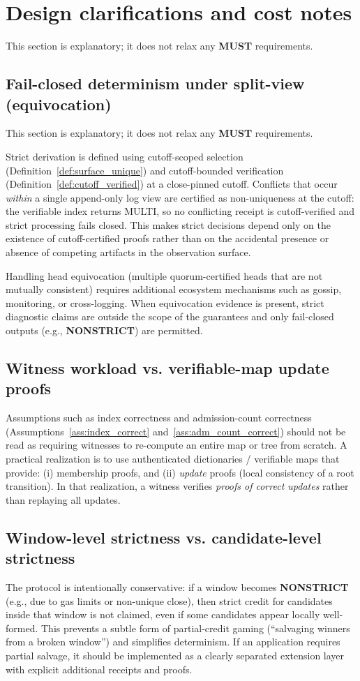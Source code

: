 \documentclass[11pt]{article}
\newcommand{\MUST}{\textbf{MUST}}
\newcommand{\1}{\mathbf{1}}
\theoremstyle{definition}
\theoremstyle{plain}
\begin{document}
\section{Design clarifications and cost notes}
\label{sec:clarifications}

This section is explanatory; it does not relax any \MUST{} requirements.

\subsection{Fail-closed determinism under split-view (equivocation)}
This section is explanatory; it does not relax any \MUST{} requirements.

Strict derivation is defined using cutoff-scoped selection (Definition~\ref{def:surface_unique}) and cutoff-bounded verification (Definition~\ref{def:cutoff_verified}) at a close-pinned cutoff.
Conflicts that occur \emph{within} a single append-only log view are certified as non-uniqueness at the cutoff: the verifiable index returns \textsf{MULTI}, so no conflicting receipt is cutoff-verified and strict processing fails closed.
This makes strict decisions depend only on the existence of cutoff-certified proofs rather than on the accidental presence or absence of competing artifacts in the observation surface.

Handling head equivocation (multiple quorum-certified heads that are not mutually consistent) requires additional ecosystem mechanisms such as gossip, monitoring, or cross-logging.
When equivocation evidence is present, strict diagnostic claims are outside the scope of the guarantees and only fail-closed outputs (e.g., \textbf{NONSTRICT}) are permitted.


\subsection{Witness workload vs. verifiable-map update proofs}
Assumptions such as index correctness and admission-count correctness (Assumptions~\ref{ass:index_correct} and~\ref{ass:adm_count_correct})
should not be read as requiring witnesses to re-compute an entire map or tree from scratch.
A practical realization is to use authenticated dictionaries / verifiable maps that provide:
(i) membership proofs, and (ii) \emph{update} proofs (local consistency of a root transition).
In that realization, a witness verifies \emph{proofs of correct updates} rather than replaying all updates.

\subsection{Window-level strictness vs. candidate-level strictness}
The protocol is intentionally conservative: if a window becomes \textbf{NONSTRICT} (e.g., due to gas limits or non-unique close),
then strict credit for candidates inside that window is not claimed, even if some candidates appear locally well-formed.
This prevents a subtle form of partial-credit gaming (``salvaging winners from a broken window'') and simplifies determinism.
If an application requires partial salvage, it should be implemented as a clearly separated extension layer with explicit additional receipts and proofs.
\end{document}
